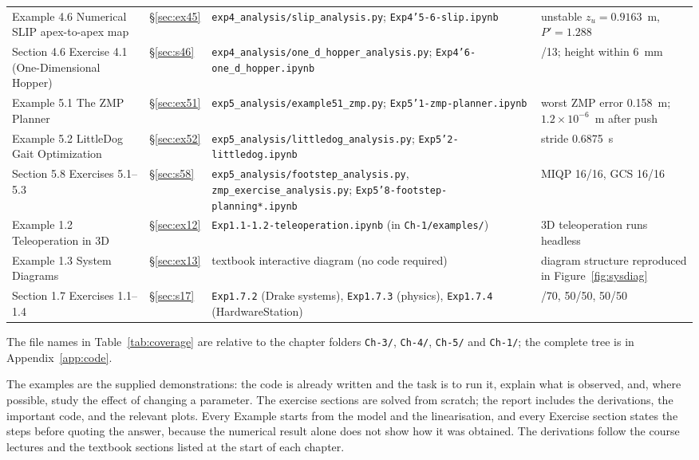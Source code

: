 \documentclass[11pt]{report}
\begin{document}
\begin{table}[!htbp]
\begin{tabular}{@{}>{\raggedright\arraybackslash}p{}>{\raggedright\arraybackslash}p{}>{\raggedright\arraybackslash}p{}>{\raggedright\arraybackslash}p{}@{}}
Example 4.6 Numerical SLIP apex-to-apex map
  & \S\ref{sec:ex45}
  & \texttt{exp4\_analysis/slip\_analysis.py};
    \texttt{Exp4'5-6-slip.ipynb}
  & unstable \(z_u=0.9163\)~m, \(P'=1.288\) \\
Section 4.6 Exercise 4.1 (One-Dimensional Hopper)
  & \S\ref{sec:s46}
  & \texttt{exp4\_analysis/one\_d\_hopper\_analysis.py};
    \texttt{Exp4'6-one\_d\_hopper.ipynb}
  & 13/13; height within 6~mm \\
\midrule
Example 5.1 The ZMP Planner
  & \S\ref{sec:ex51}
  & \texttt{exp5\_analysis/example51\_zmp.py};
    \texttt{Exp5'1-zmp-planner.ipynb}
  & worst ZMP error 0.158~m; \(1.2\times10^{-6}\)~m after push \\
Example 5.2 LittleDog Gait Optimization
  & \S\ref{sec:ex52}
  & \texttt{exp5\_analysis/littledog\_analysis.py};
    \texttt{Exp5'2-littledog.ipynb}
  & stride 0.6875~s \\
Section 5.8 Exercises 5.1--5.3
  & \S\ref{sec:s58}
  & \texttt{exp5\_analysis/footstep\_analysis.py},
    \texttt{zmp\_exercise\_analysis.py};
    \texttt{Exp5'8-footstep-planning*.ipynb}
  & MIQP 16/16, GCS 16/16 \\
\midrule
Example 1.2 Teleoperation in 3D
  & \S\ref{sec:ex12}
  & \texttt{Exp1.1-1.2-teleoperation.ipynb} (in \texttt{Ch-1/examples/})
  & 3D teleoperation runs headless \\
Example 1.3 System Diagrams
  & \S\ref{sec:ex13}
  & textbook interactive diagram (no code required)
  & diagram structure reproduced in Figure~\ref{fig:sysdiag} \\
Section 1.7 Exercises 1.1--1.4
  & \S\ref{sec:s17}
  & \texttt{Exp1.7.2} (Drake systems),
    \texttt{Exp1.7.3} (physics),
    \texttt{Exp1.7.4} (HardwareStation)
  & 70/70, 50/50, 50/50 \\
\bottomrule
\end{tabular}
\end{table}

The file names in Table~\ref{tab:coverage} are relative to the chapter folders
\texttt{Ch-3/}, \texttt{Ch-4/}, \texttt{Ch-5/} and \texttt{Ch-1/}; the complete
tree is in Appendix~\ref{app:code}.

The examples are the supplied demonstrations: the code is already written and
the task is to run it, explain what is observed, and, where possible, study the
effect of changing a parameter.  The exercise sections are solved from scratch;
the report includes the derivations, the important code, and the relevant
plots.  Every Example starts from the model and the linearisation, and every
Exercise section states the steps before quoting the answer, because the
numerical result alone does not show how it was obtained.  The derivations
follow the course lectures \cite{lectures} and the textbook sections listed at
the start of each chapter.
\end{document}
